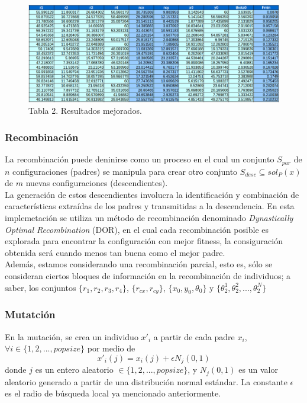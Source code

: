 \documentclass[10pt,journal,compsoc]{styles/IEEEtran}
\begin{document}
    \begin{figure}[ht]
    \center
    \includegraphics[width = 1.0\textwidth]{tabla2.png}
    \caption{Tabla 2. Resultados mejorados.}
  \end{figure}
  
\subsubsection{Recombinaci\'on}

La recombinaci\'on puede deninirse como un proceso en el cual un conjunto $S_{par}$ de $n$ configuraciones (padres) se manipula para crear otro conjunto $S_{desc} \subseteq sol_P (x)$ de $m$ nuevas configuraciones (descendientes).\\

La generaci\'on de estos descendientes involucra la identificaci\'on y combinaci\'on de caracter\'isticas extra\'idas de los padres y transmitidas a la descendencia. En esta implemetaci\'on se utiliza un m\'etodo de recombinaci\'on denominado \emph{Dynastically Optimal Recombination} (DOR), en el cual cada recombinaci\'on posible es explorada para encontrar la configuraci\'on con mejor fitness, la consiguraci\'on obtenida ser\'a cuando menos tan buena como el mejor padre.\\

Adem\'as, estamos considerando una recombinaci\'on parcial, esto es, s\'olo se consideran ciertos bloques de informaci\'on en la recombinaci\'on de individuos; a saber, los conjuntos  $\{r_1,r_2,r_3,r_4\}$, $\{r_{cx},r_{cy}\}$, $\{x_0,y_0,\theta_0\}$ y $\{\theta_2^1,\theta_2^2,...,\theta_2^N\}$\\

\subsubsection{Mutatci\'on}

En la mutaci\'on, se crea un individuo $x'_i$ a partir de cada padre $x_i$, $\forall i \in \{1,2,...,popsize\}$ por medio de
 $$x'_i(j)=x_i(j)+\epsilon N_j(0,1)$$
 donde $j$ es un entero aleatorio $\in \{1,2,...,popsize\}$, y $N_j(0,1)$ es un valor aleatorio generado a partir de una distribuci\'on normal est\'andar. La constante $\epsilon$ es el radio de b\'usqueda local ya mencionado anteriormente.\\
 
\end{document}
